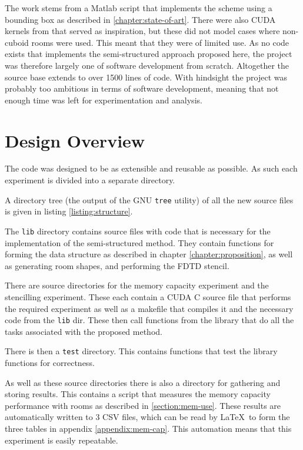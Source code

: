 \documentclass[12pt,a4paper]{report}
\begin{document}
The work stems from a Matlab script that implements the scheme using a bounding box as described in \ref{chapter:state-of-art}. There were also CUDA kernels from \cite{craig} that served as inspiration, but these did not model cases where non-cuboid rooms were used. This meant that they were of limited use. As no code exists that implements the semi-structured approach proposed here, the project was therefore largely one of software development from scratch. Altogether the source base extends to over 1500 lines of code. With hindsight the project was probably too ambitious in terms of software development, meaning that not enough time was left for experimentation and analysis.

\section{Design Overview}

The code was designed to be as extensible and reusable as possible. As such each experiment is divided into a separate directory. 

A directory tree (the output of the GNU \verb|tree| utility) of all the new source files is given in listing \ref{listing:structure}.

The \verb|lib| directory contains source files with code that is necessary for the implementation of the semi-structured method. They contain functions for forming the data structure as described in chapter \ref{chapter:proposition}, as well as generating room shapes, and performing the FDTD stencil.

There are source directories for the memory capacity experiment and the stencilling experiment. These each contain a CUDA C source file that performs the required experiment as well as a makefile that compiles it and the necessary code from the \verb|lib| dir. These then call functions from the library that do all the tasks associated with the proposed method. 

There is then a \verb|test| directory. This contains functions that test the library functions for correctness.

As well as these source directories there is also a directory for gathering and storing results. This contains a script that measures the memory capacity performance with rooms as described in \ref{section:mem-use}. These results are automatically written to 3 CSV files, which can be read by \LaTeX\ to form the three tables in appendix \ref{appendix:mem-cap}. This automation means that this experiment is easily repeatable.
\end{document}

